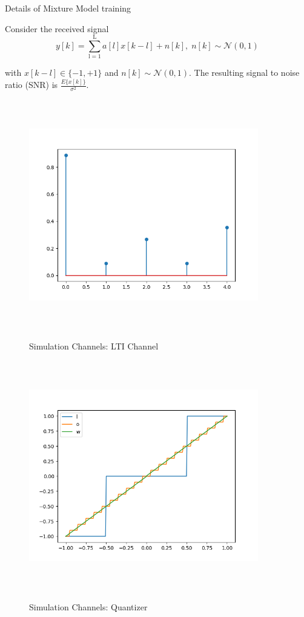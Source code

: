 \documentclass[12pt,a4paper]{report}
\begin{document}
Details of Mixture Model training


Consider the received signal 
\begin{equation}
y[k] = \sum_{\mathrm{l=1}}^{\mathrm{L}} a[l]x[k-l] + n[k], \; n[k]  \sim \mathcal{N}(0,1)
\end{equation}

with $x[k-l] \in \{ -1, +1\}$ and $n[k]  \sim \mathcal{N}(0,1)$.  
The resulting signal to noise ratio (SNR) is 
$\frac{E\{x[k]\}}{\sigma^2}$.


\begin{figure}[H]
\centering
	  \caption{Simulation Channels: LTI Channel}
	\includegraphics[width=10cm,height = 10cm]{system_model/lti_channel}
	  \label{fig:LTI Channel}
\end{figure}
\begin{figure}[H]
	  \caption{Simulation Channels: Quantizer}
	\includegraphics[width=10cm,height = 10cm]{system_model/quantizer}
	  \label{fig:Quantized Channel}
\end{figure}
\end{document}
